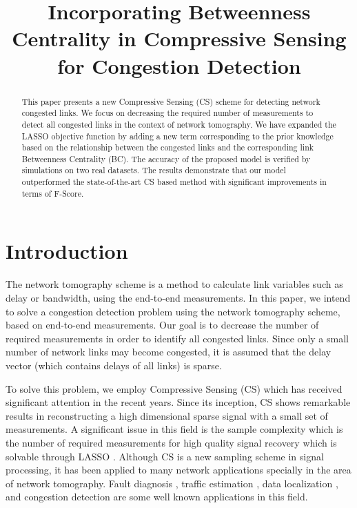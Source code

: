 \documentclass{article}
\begin{document}
\title{Incorporating Betweenness Centrality in Compressive Sensing for Congestion Detection}

\address{Sharif University of Technology, Tehran, Iran}

\maketitle

\begin{abstract}
This paper presents a new Compressive Sensing (CS) scheme for detecting network congested links. We focus on decreasing the required number of measurements to detect all congested links in the context of network tomography. We have expanded the LASSO objective function by adding a new term corresponding to the prior knowledge based on the relationship between the congested links and the corresponding link Betweenness Centrality (BC). The accuracy of the proposed model is verified by simulations on two real datasets. The results demonstrate that our model outperformed the state-of-the-art CS based method with significant improvements in terms of F-Score. \end{abstract}

\section{Introduction}
The network tomography scheme is a method to calculate link variables such as delay or bandwidth, using the end-to-end measurements. In this paper, we intend to solve a congestion detection problem using the network tomography scheme, based on end-to-end measurements. Our goal is to decrease the number of required measurements in order to identify all congested links. Since only a small number of network links may become congested, it is assumed that the delay vector (which contains delays of all links) is sparse. 

To solve this problem, we employ Compressive Sensing (CS) \cite{CSIntro} which has received significant attention in the recent years. Since its inception, CS shows remarkable results in reconstructing a high dimensional sparse signal with a small set of measurements. A significant issue in this field is the sample complexity which is the number of required measurements for high quality signal recovery which is solvable through LASSO \cite{CSIntro}. Although CS is a new sampling scheme in signal processing, it has been applied to many network applications specially in the area of network tomography. Fault diagnosis \cite{NetTom2}, traffic estimation \cite{NetTom1}, data localization \cite{CSP2P}, and congestion detection \cite{CSoverGraph} are some well known applications in this field.
\end{document}
